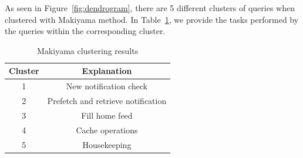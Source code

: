 As seen in Figure~\ref{fig:dendrogram}, there are 5 different clusters of queries when clustered with Makiyama method. In Table~\ref{tab:clusteringresult}, we provide the tasks performed by the queries within the corresponding cluster.

\begin{table}[h!]
\centering
\caption{Makiyama clustering results}
\label{tab:clusteringresult}
\begin{tabular}{cc}
\hline
\textbf{Cluster} & \textbf{Explanation}                        \\ \hline
1       & New notification check             \\ 
2       & Prefetch and retrieve notification \\ 
3       & Fill home feed                     \\ 
4       & Cache operations                   \\ 
5       & Housekeeping                       \\ \hline
\end{tabular}
\end{table}





